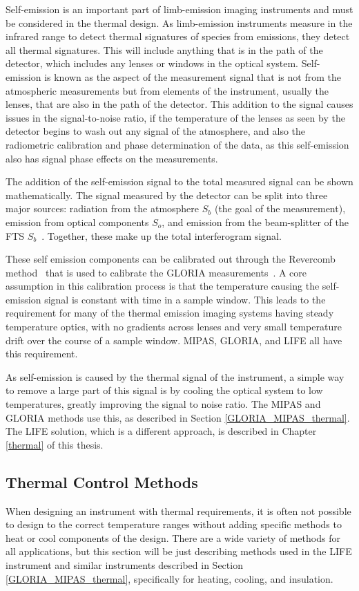 Self-emission is an important part of limb-emission imaging instruments and must be considered in the thermal design. As limb-emission instruments measure in the infrared range to detect thermal signatures of species from emissions, they detect all thermal signatures. This will include anything that is in the path of the detector, which includes any lenses or windows in the optical system. Self-emission is known as the aspect of the measurement signal that is not from the atmospheric measurements but from elements of the instrument, usually the lenses, that are also in the path of the detector. This addition to the signal causes issues in the signal-to-noise ratio, if the temperature of the lenses as seen by the detector begins to wash out any signal of the atmosphere, and also the radiometric calibration and phase determination of the data, as this self-emission also has signal phase effects on the measurements.

The addition of the self-emission signal to the total measured signal can be shown mathematically. The signal measured by the detector can be split into three major sources: radiation from the atmosphere $S_b$ (the goal of the measurement), emission from optical components $S_o$, and emission from the beam-splitter of the FTS $S_b$~\citep{self-emission_general}. Together, these make up the total interferogram signal.

These self emission components can be calibrated out through the Revercomb method~\citep{Revercomb_method} that is used to calibrate the GLORIA measurements~\citep{gloria_self_emission}. A core assumption in this calibration process is that the temperature causing the self-emission signal is constant with time in a sample window. This leads to the requirement for many of the thermal emission imaging systems having steady temperature optics, with no gradients across lenses and very small temperature drift over the course of a sample window. MIPAS, GLORIA, and LIFE all have this requirement.

As self-emission is caused by the thermal signal of the instrument, a simple way to remove a large part of this signal is by cooling the optical system to low temperatures, greatly improving the signal to noise ratio. The MIPAS and GLORIA methods use this, as described in Section \ref{GLORIA_MIPAS_thermal}. The LIFE solution, which is a different approach, is described in Chapter \ref{thermal} of this thesis.

\subsection{Thermal Control Methods} \label{Thermal_methods} %
When designing an instrument with thermal requirements, it is often not possible to design to the correct temperature ranges without adding specific methods to heat or cool components of the design. There are a wide variety of methods for all applications, but this section will be just describing methods used in the LIFE instrument and similar instruments described in Section \ref{GLORIA_MIPAS_thermal}, specifically for heating, cooling, and insulation.

